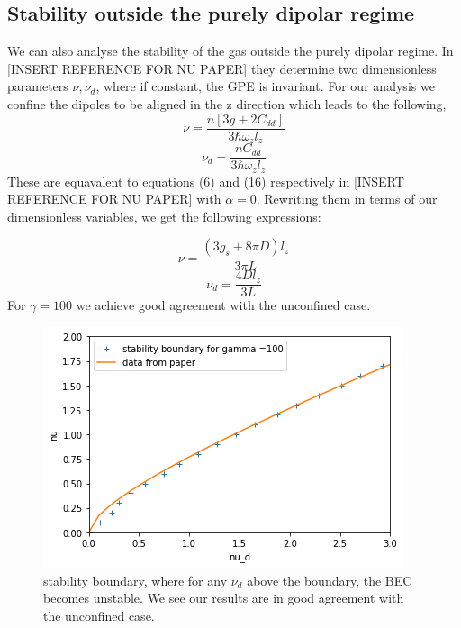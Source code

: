 \documentclass[10pt]{article}
\numberwithin{equation}{section}
\begin{document}
\begin{multicols}{2}
\section{Stability outside the purely dipolar regime}
We can also analyse the stability of the gas outside the purely dipolar regime. In [INSERT REFERENCE FOR NU PAPER] they determine two dimensionless parameters ${\nu,\nu_{d}}$, where if constant, the GPE is invariant. For our analysis we confine the dipoles to be aligned in the z direction which leads to the following,
 \begin{equation}
\nu = \frac{n[3g+2C_{dd}]}{3\hbar\omega_{z}l_{z}}
\end{equation} 
\begin{equation}
\nu_{d} = \frac{nC_{dd}}{3\hbar\omega_{z}l_{z}}
\end{equation} 
These are equavalent to equations (6) and (16) respectively in [INSERT REFERENCE FOR NU PAPER] with $\alpha=0$.
Rewriting them in terms of our dimensionless variables, we get the following expressions:

 \begin{equation}
\nu = \frac{(3g_{s}+8\pi D)l_{z}}{3\pi L}
\end{equation} 
\begin{equation}
\nu_{d} = \frac{4Dl_{z}}{3L}
\end{equation} 
For $\gamma=100$ we achieve good agreement with the unconfined case.

\begin{figure}[H]
\centering
\includegraphics[width=\linewidth]{stability boundary comparison}
\caption{stability boundary, where for any $\nu_{d}$ above the boundary, the BEC becomes unstable. We see our results are in good agreement with the unconfined case.}
\end{figure}


\end{multicols}
\end{document}
